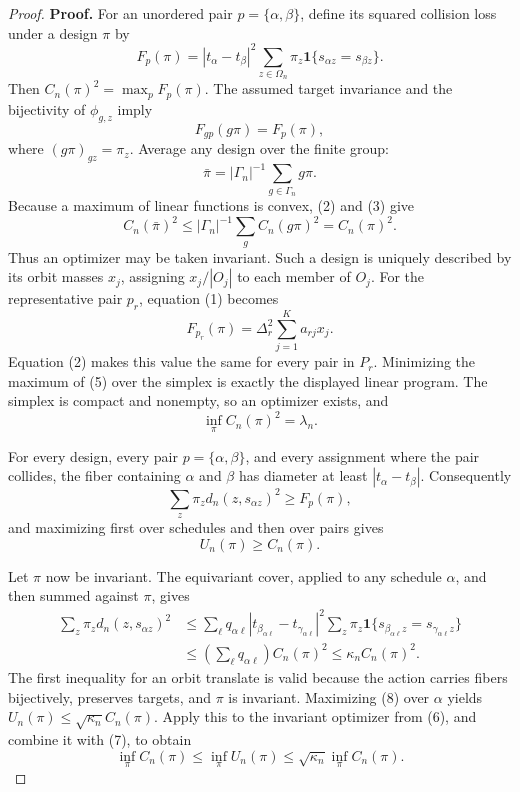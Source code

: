 \documentclass{article}
\begin{document}
\begin{proof}
\textbf{Proof.}
For an unordered pair \(p=\{\alpha,\beta\}\), define its squared collision loss under a design \(\pi\) by
\[
 F_p(\pi)=|t_\alpha-t_\beta|^2
 \sum_{z\in\Omega_n}\pi_z
 \mathbf 1\{s_{\alpha z}=s_{\beta z}\}. \tag{1}
\]
Then \(C_n(\pi)^2=\max_pF_p(\pi)\). The assumed target invariance and the bijectivity of \(\phi_{g,z}\) imply
\[
 F_{gp}(g\pi)=F_p(\pi), \tag{2}
\]
where \((g\pi)_{gz}=\pi_z\). Average any design over the finite group:
\[
 \bar\pi=|\Gamma_n|^{-1}\sum_{g\in\Gamma_n}g\pi. \tag{3}
\]
Because a maximum of linear functions is convex, (2) and (3) give
\[
 C_n(\bar\pi)^2
 \le |\Gamma_n|^{-1}\sum_g C_n(g\pi)^2
 =C_n(\pi)^2. \tag{4}
\]
Thus an optimizer may be taken invariant. Such a design is uniquely described by its orbit masses \(x_j\), assigning \(x_j/|O_j|\) to each member of \(O_j\). For the representative pair \(p_r\), equation (1) becomes
\[
 F_{p_r}(\pi)=\Delta_r^2\sum_{j=1}^K a_{rj}x_j. \tag{5}
\]
Equation (2) makes this value the same for every pair in \(P_r\). Minimizing the maximum of (5) over the simplex is exactly the displayed linear program. The simplex is compact and nonempty, so an optimizer exists, and
\[
 \inf_\pi C_n(\pi)^2=\lambda_n. \tag{6}
\]

For every design, every pair \(p=\{\alpha,\beta\}\), and every assignment where the pair collides, the fiber containing \(\alpha\) and \(\beta\) has diameter at least \(|t_\alpha-t_\beta|\). Consequently
\[
 \sum_z\pi_zd_n(z,s_{\alpha z})^2\ge F_p(\pi),
\]
and maximizing first over schedules and then over pairs gives
\[
 U_n(\pi)\ge C_n(\pi). \tag{7}
\]

Let \(\pi\) now be invariant. The equivariant cover, applied to any schedule \(\alpha\), and then summed against \(\pi\), gives
\[
 \begin{aligned}
 \sum_z\pi_zd_n(z,s_{\alpha z})^2
 &\le \sum_\ell q_{\alpha\ell}
 |t_{\beta_{\alpha\ell}}-t_{\gamma_{\alpha\ell}}|^2
 \sum_z\pi_z\mathbf 1\{s_{\beta_{\alpha\ell}z}=s_{\gamma_{\alpha\ell}z}\}\\
 &\le \left(\sum_\ell q_{\alpha\ell}\right)C_n(\pi)^2
 \le\kappa_n C_n(\pi)^2. \tag{8}
 \end{aligned}
\]
The first inequality for an orbit translate is valid because the action carries fibers bijectively, preserves targets, and \(\pi\) is invariant. Maximizing (8) over \(\alpha\) yields \(U_n(\pi)\le\sqrt{\kappa_n}C_n(\pi)\). Apply this to the invariant optimizer from (6), and combine it with (7), to obtain
\[
 \inf_\pi C_n(\pi)
 \le\inf_\pi U_n(\pi)
 \le\sqrt{\kappa_n}\inf_\pi C_n(\pi). \tag{9}
\]


\end{proof}
\end{document}
